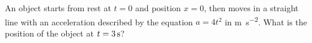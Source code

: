 \documentclass{../../../oss-apphys-exam}
\begin{document}
\begin{questions}
%  
%    

  \question An object starts from rest at $t=0$ and position $x=0$, then moves
  in a straight line with an acceleration described by the equation $a=4t^2$ in
  \si{\metre\per\second\squared}. What is the position of the object at
  $t=\SI3\second$?
  \newpage
  

\end{questions}
\end{document}

